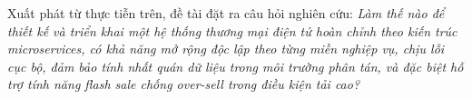 \documentclass[../DoAn.tex]{subfiles}
\begin{document}
Xuất phát từ thực tiễn trên, đề tài đặt ra câu hỏi nghiên cứu: \textit{Làm thế nào để thiết
kế và triển khai một hệ thống thương mại điện tử hoàn chỉnh theo kiến trúc microservices, có
khả năng mở rộng độc lập theo từng miền nghiệp vụ, chịu lỗi cục bộ, đảm bảo tính nhất quán
dữ liệu trong môi trường phân tán, và đặc biệt hỗ trợ tính năng flash sale chống over-sell
trong điều kiện tải cao?}







\end{document}
